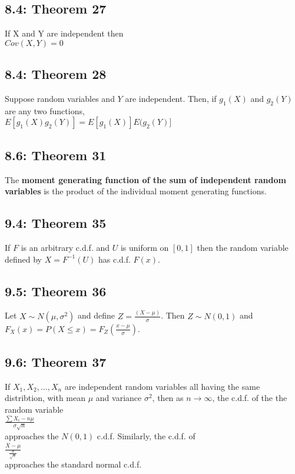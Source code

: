 \documentclass[11pt]{article}
\begin{document}
	\subsection*{8.4: Theorem 27}
	If X and Y are independent then\\
	 $Cov(X,Y)=0$\\
	\subsection*{8.4: Theorem 28}
		Suppose random variables  and $Y$ are independent. Then, if $g_1(X)$ and $g_2(Y)$ are any two functions,\\
	$E[g_1(X)g_2(Y)] = E[g_1(X)]E(g_2(Y)]$	
	
	\subsection*{8.6: Theorem 31}
		The {\bf moment generating function of the sum of independent random variables} is the product of the individual moment generating functions.
		
	\subsection*{9.4: Theorem 35}
		If $F$ is an arbitrary c.d.f. and $U$ is uniform on $[0,1]$ then the random variable defined by $X=F^{-1}(U)$ has c.d.f. $F(x)$.
	
	\subsection*{9.5: Theorem 36}
		Let $X \sim N(\mu,\sigma^2)$ and define $Z=\frac{(X-\mu)}{\sigma}$. Then $Z\sim N(0,1)$ and\\
		$F_X(x)=P(X\leq x) = F_Z(\frac{x-\mu}{\sigma})$.
	
	\subsection*{9.6: Theorem 37}
		If $X_1,X_2,...,X_n$ are independent random variables all having the same distribtion, with mean $\mu$ and variance $\sigma^2$, then as $n \rightarrow \infty$, the c.d.f. of the the random variable \\
		$\frac{\sum X_i-n\mu}{\sigma\sqrt{n}}$\\
		approaches the $N(0,1)$ c.d.f. Similarly, the c.d.f. of\\
		$\frac{\overline{X}-\mu}{\frac{\sigma}{\sqrt{n}}}$\\
		approaches the standard normal c.d.f.
	
\end{document}
